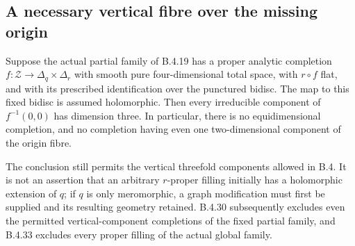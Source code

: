 \subsection{A necessary vertical fibre over the missing origin}

\begin{proposition}
\label{push:B426}
Suppose the actual partial family of B.4.19 has a
proper analytic completion $f:\mathcal Z\to\Delta_q\times\Delta_r$
with smooth pure four-dimensional total space, with
$r\circ f$ flat, and with its prescribed identification
over the punctured bidisc. The map to this fixed bidisc
is assumed holomorphic. Then every irreducible component
of $f^{-1}(0,0)$ has dimension three. In particular,
there is no equidimensional completion, and no completion
having even one two-dimensional component of the origin
fibre.

The conclusion still permits the vertical threefold
components allowed in B.4. It is not an assertion that
an arbitrary $r$-proper filling initially has a holomorphic
extension of $q$; if $q$ is only meromorphic, a graph
modification must first be supplied and its resulting
geometry retained. B.4.30 subsequently excludes even
the permitted vertical-component completions of the
fixed partial family, and B.4.33 excludes every proper
filling of the actual global family.
\end{proposition}

